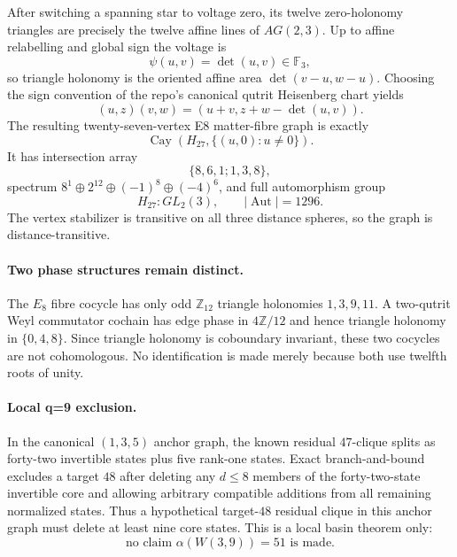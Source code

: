 After switching a spanning star to voltage zero, its twelve zero-holonomy triangles are precisely the twelve affine lines of $AG(2,3)$.  Up to affine relabelling and global sign the voltage is
\[
  \boxed{\psi(u,v)=\det(u,v)\in\mathbb F_3},
\]
so triangle holonomy is the oriented affine area $\det(v-u,w-u)$.  Choosing the sign convention of the repo's canonical qutrit Heisenberg chart yields
\[
 (u,z)(v,w)=(u+v,z+w-\det(u,v)).
\]
The resulting twenty-seven-vertex E8 matter-fibre graph is exactly
\[
  \boxed{\operatorname{Cay}\!\left(H_{27},\{(u,0):u\ne0\}\right)}.
\]
It has intersection array
\[
  \boxed{\{8,6,1;1,3,8\}},
\]
spectrum $8^1\oplus2^{12}\oplus(-1)^8\oplus(-4)^6$, and full automorphism group
\[
  \boxed{H_{27}{:}GL_2(3)},\qquad |\operatorname{Aut}|=1296.
\]
The vertex stabilizer is transitive on all three distance spheres, so the graph is distance-transitive.

\paragraph{Two phase structures remain distinct.}
The $E_8$ fibre cocycle has only odd $\mathbb Z_{12}$ triangle holonomies $1,3,9,11$.  A two-qutrit Weyl commutator cochain has edge phase in $4\mathbb Z/12$ and hence triangle holonomy in $\{0,4,8\}$.  Since triangle holonomy is coboundary invariant, these two cocycles are not cohomologous.  No identification is made merely because both use twelfth roots of unity.

\paragraph{Local q=9 exclusion.}
In the canonical $(1,3,5)$ anchor graph, the known residual $47$-clique splits as forty-two invertible states plus five rank-one states.  Exact branch-and-bound excludes a target $48$ after deleting any $d\le8$ members of the forty-two-state invertible core and allowing arbitrary compatible additions from all remaining normalized states.  Thus a hypothetical target-$48$ residual clique in this anchor graph must delete at least nine core states.  This is a local basin theorem only:
\[
  \boxed{\text{no claim }\alpha(W(3,9))=51\text{ is made.}}
\]
